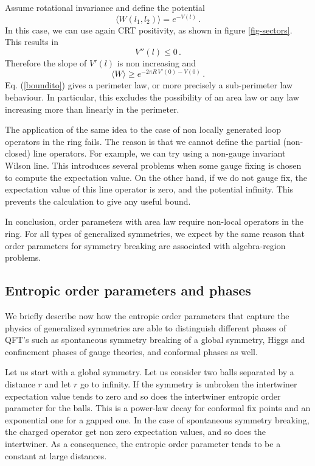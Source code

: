 \documentclass[12pt]{article}
\numberwithin{equation}{section}
\newcommand{\be}{\begin{equation}}
\newcommand{\ee}{\end{equation}}
\begin{document}
Assume rotational invariance and define the potential
\be
\langle W(l_1,l_2)\rangle =e^{-V(l)}\,.\label{hh}
\ee
 In this case, we can use again CRT positivity, as shown in figure \ref{fig-sectors}. This results in
\be 
 V''(l)\le 0\,.
\ee   
Therefore the slope of $V'(l)$ is non increasing and
\be
\langle W \rangle \ge e^{-2 \pi R \,V'(0)-V(0)} \,. \label{boundito}
\ee
 Eq. (\ref{boundito}) gives a perimeter law, or more precisely a sub-perimeter law behaviour. In particular, this excludes the possibility of an area law or any law increasing more than linearly in the perimeter.   

The application of the same idea to the case of non locally generated loop operators in the ring fails. The reason is that we cannot define the partial (non-closed) line operators. For example, we can try using a non-gauge invariant Wilson line.  This introduces several problems when some gauge fixing is chosen to compute the expectation value. On the other hand, if we do not gauge fix, the expectation value of this line operator is zero, and the potential infinity. This prevents the calculation to give any useful bound.   

In conclusion, order parameters with area law require non-local operators in the ring. For all types of generalized symmetries, we expect by the same reason that order parameters for symmetry breaking are associated with algebra-region problems.  





\subsection{Entropic order parameters and phases}

We briefly describe now how the entropic order parameters that capture the physics of generalized symmetries are able to distinguish different phases of QFT's such as spontaneous symmetry breaking of a global symmetry, Higgs and confinement phases of gauge theories, and conformal phases as well. 


Let us start with a global symmetry. Let us consider two balls separated by a distance $r$ and let $r$ go to infinity. If the symmetry is unbroken the intertwiner expectation value tends to zero and so does the intertwiner entropic order parameter for the balls. This is a power-law decay for conformal fix points and an exponential one for a gapped one. 
In the case of spontaneous symmetry breaking, the charged operator get non zero expectation values, and so does the intertwiner.  As a consequence, the entropic order parameter tends to be a constant at large distances.
\end{document}
